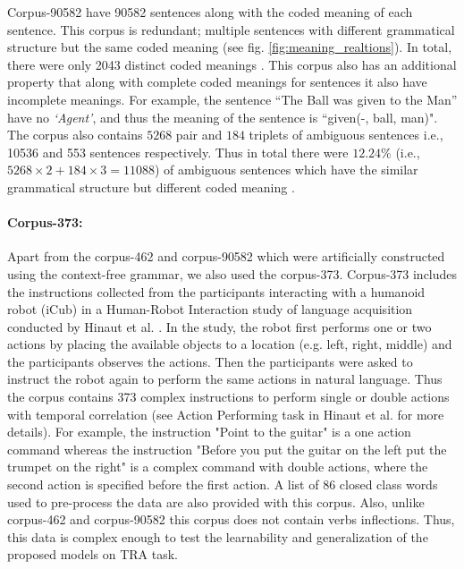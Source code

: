 Corpus-90582 have 90582 sentences along with the coded meaning of each sentence. This corpus is redundant; multiple sentences with different grammatical structure but the same coded meaning (see fig. \ref{fig:meaning_realtions}). In total, there were only 2043 distinct coded meanings \cite{xavier:2013:RT}. This corpus also has an additional property that along with complete coded meanings for sentences it also have incomplete meanings. For example, the sentence ``The Ball was given to the Man” have no \textit{`Agent'}, and thus the meaning of the sentence is ``given(-, ball, man)". The corpus also contains $5268$ pair and $184$ triplets of ambiguous sentences i.e., 10536 and 553 sentences respectively. Thus in total there were $12.24 \%$ (i.e., $ 5268 \times 2 + 184 \times 3 = 11088 $) of ambiguous sentences which have the similar grammatical structure but different coded meaning \cite{xavier:2013:RT}.

\paragraph{Corpus-373:} Apart from the corpus-462 and corpus-90582 which were artificially constructed using the context-free grammar, we also used the corpus-373. Corpus-373 includes the instructions collected from the participants interacting with a humanoid robot (iCub) in a Human-Robot Interaction study of language acquisition conducted by Hinaut et al. \cite{tra:xavier_hri}. In the study, the robot first performs one or two actions by placing the available objects to a location (e.g. left, right, middle) and the participants observes the actions. Then the participants were asked to instruct the robot again to perform the same actions in natural language. Thus the corpus contains 373 complex instructions to perform single or double actions with temporal correlation (see Action Performing task in Hinaut et al. \cite{tra:tra:xavier_hri} for more details). For example, the instruction "Point to the guitar" is a one action command whereas the instruction "Before you put the guitar on the left put the trumpet on the right" is a complex command with double actions, where the second action is specified before the first action. A list of 86 closed class words used to pre-process the data are also provided with this corpus. Also, unlike corpus-462 and corpus-90582 this corpus does not contain verbs inflections. Thus, this data is complex enough to test the learnability and generalization of the proposed models on TRA task.

